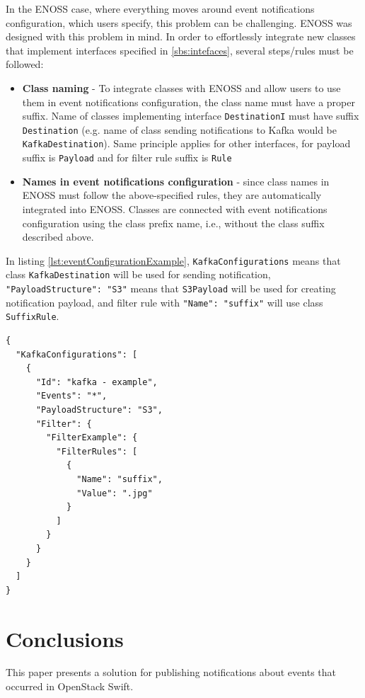 \documentclass{ExcelAtFIT}
\begin{document}
In the ENOSS case, where everything moves around event notifications configuration, which users specify, this problem can be challenging. ENOSS was designed with this problem in mind. In order to effortlessly integrate new classes that implement interfaces specified in \ref{sbs:intefaces}, several steps/rules must be followed:
\begin{itemize}
    \item \textbf{Class naming} - To integrate classes with ENOSS and allow users to use them in event notifications configuration, the class name must have a proper suffix. Name of classes implementing interface \texttt{DestinationI} must have suffix \texttt{Destination} (e.g. name of class sending notifications to Kafka would be \texttt{KafkaDestination}). Same principle applies for other interfaces, for payload suffix is \texttt{Payload} and for filter rule suffix is \texttt{Rule}
    \item \textbf{Names in event notifications configuration} - since class names in ENOSS must follow the above-specified rules, they are automatically integrated into ENOSS. Classes are connected with event notifications configuration using the class prefix name, i.e., without the class suffix described above.
\end{itemize}

In listing \ref{lst:eventConfigurationExample}, \texttt{KafkaConfigurations} means that class \texttt{KafkaDestination} will be used for sending notification, \texttt{"PayloadStructure": "S3"} means that \texttt{S3Payload} will be used for creating notification payload, and filter rule with \texttt{"Name": "suffix"} will use class \texttt{SuffixRule}.

\begin{lstlisting}[style=jsonStyle, caption=Example of event notifications configuration,    label=lst:eventConfigurationExample]
{
  "KafkaConfigurations": [
    {
      "Id": "kafka - example",
      "Events": "*",
      "PayloadStructure": "S3",
      "Filter": {
        "FilterExample": {
          "FilterRules": [
            {
              "Name": "suffix",
              "Value": ".jpg"
            }
          ]
        }
      }
    }
  ]
}
\end{lstlisting}

\section{Conclusions}
\label{sec:conclusions}


This paper presents a solution for publishing notifications about events that occurred in OpenStack Swift.
\end{document}
